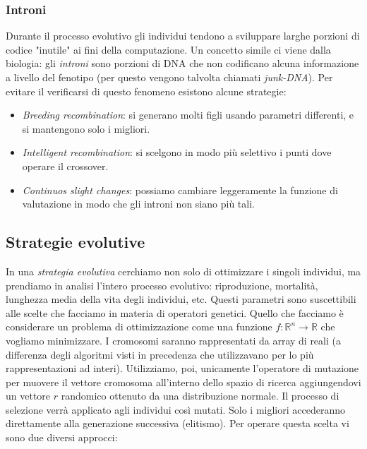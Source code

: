 \documentclass[10pt,a4paper]{article}
\begin{document}
\subsubsection{Introni}

Durante il processo evolutivo gli individui tendono a sviluppare larghe porzioni di codice "inutile" ai fini della computazione. Un concetto simile ci viene dalla biologia: gli \emph{introni} sono porzioni di DNA che non codificano alcuna informazione a livello del fenotipo (per questo vengono talvolta chiamati \emph{junk-DNA}). Per evitare il verificarsi di questo fenomeno esistono alcune strategie:

\begin{itemize}
\item{\emph{Breeding recombination}: si generano molti figli usando parametri differenti, e si mantengono solo i migliori.}
\item{\emph{Intelligent recombination}: si scelgono in modo più selettivo i punti dove operare il crossover.}
\item{\emph{Continuos slight changes}: possiamo cambiare leggeramente la funzione di valutazione in modo che gli introni non siano più tali.}
\end{itemize}

\subsection{Strategie evolutive}

In una \emph{strategia evolutiva} cerchiamo non solo di ottimizzare i singoli individui, ma prendiamo in analisi l'intero processo evolutivo: riproduzione, mortalità, lunghezza media della vita degli individui, etc. Questi parametri sono suscettibili alle scelte che facciamo in materia di operatori genetici. Quello che facciamo è considerare un problema di ottimizzazione come una funzione $f: \mathbb{R}^n \to \mathbb{R}$ che vogliamo minimizzare. I cromosomi saranno rappresentati da array di reali (a differenza degli algoritmi visti in precedenza che utilizzavano per lo più rappresentazioni ad interi). Utilizziamo, poi, unicamente l'operatore di mutazione per muovere il vettore cromosoma all'interno dello spazio di ricerca aggiungendovi un vettore $r$ randomico ottenuto da una distribuzione normale. Il processo di selezione verrà applicato agli individui così mutati. Solo i migliori accederanno direttamente alla generazione successiva (elitismo). Per operare questa scelta vi sono due diversi approcci:
\end{document}
